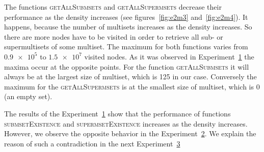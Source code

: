 The functions \textsc{getAllSubmsets} and \textsc{getAllSupermsets} decrease 
their performance as the density increases (see figures~\ref{fig:e2m3} 
and~\ref{fig:e2m4}). It happens, because the number of multisets increases as 
the density increases. So there are more nodes have to be visited in order to 
retrieve all sub- or supermultisets of some multiset. The maximum for both functions 
varies from $\num{0.9e5}$ to $\num{1.5e7}$ visited nodes. As it was observed in 
Experiment~\hyperref[s:exp1]{1} the maxima occur at the opposite points. For the 
function \textsc{getAllSubmsets} it will always be at the largest size of multiset, 
which is 125 in our case. Conversely the maximum for the \textsc{getAllSupermsets} 
is at the smallest size of multiset, which is 0 (an empty set).

The results of the Experiment~\hyperref[s:exp1]{1} show that the performance 
of functions \textsc{submsetExistence} and \textsc{supermsetExistence} increases 
as the density increases. However, we observe the opposite behavior in the 
Experiment~\hyperref[s:exp2]{2}. We explain the reason of such a contradiction 
in the next Experiment~\hyperref[s:exp3]{3} 


%
%
%
%


